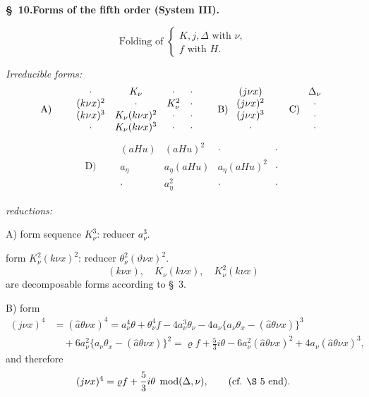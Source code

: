 \documentclass[11pt]{article}
\newcommand{\A}{\Delta}
\newcommand{\R}{\varrho}
\newcommand{\hata}{\widehat{a}}
\newcommand{\modu}[1]{\;\operatorname{mod} #1}
\providecommand{\modu}[1]{\;\operatorname{mod} #1}
\begin{document}
\begin{center}
\textbf{\S\ 10.\quad Forms of the fifth order (System III).}
\end{center}

\[
\text{Folding of }\left\{\begin{array}{l}
K,j,\A \text{ with }\nu,\\
f\text{ with }H.
\end{array}\right.
\]

\noindent\emph{Irreducible forms:}
\[
\begin{array}{c@{\qquad}c@{\qquad}c@{\qquad}c}
\text{A)} & \begin{array}{cccc}
\cdot&K_\nu&\cdot&\cdot\\
(k\nu x)^2&\cdot&K_\nu^2&\cdot\\
(k\nu x)^3&K_\nu(k\nu x)^2&\cdot&\cdot\\
\cdot&K_\nu(k\nu x)^3&\cdot&\cdot
\end{array}
&
\text{B)}\ \begin{array}{c}(j\nu x)\\(j\nu x)^2\\(j\nu x)^3\\ \cdot\end{array}
&
\text{C)}\ \begin{array}{c}\A_\nu\\\cdot\\\cdot\\\cdot\end{array}
\end{array}
\]
\[
\text{D)}\qquad
\begin{array}{cccc}
(aHu)&(aHu)^2&\cdot&\cdot\\
a_\eta&a_\eta(aHu)&a_\eta(aHu)^2&\cdot\\
\cdot&a_\eta^2&\cdot&\cdot
\end{array}
\]

\noindent\emph{reductions:}

\noindent A) form sequence $K_\nu^3$: reducer $a_\nu^3$.

form $K_\nu^2(k\nu x)^2$: reducer $\theta_\nu^2(\vartheta\nu x)^2$.
\[
(k\nu x),\quad K_\nu(k\nu x),\quad K_\nu^2(k\nu x)
\]
are decomposable forms according to \S\ 3.

\noindent B) form
\[
\begin{aligned}
(j\nu x)^4&=(\hata\theta\nu x)^4
=a_\nu^4\theta+\theta_\nu^4 f-4a_\nu^3\theta_\nu
-4a_\nu\{a_\nu\theta_x-(\hata\theta\nu x)\}^3\\
&\quad+6a_\nu^2\{a_\nu\theta_x-(\hata\theta\nu x)\}^2
=\R f+\frac53 i\theta-6a_\nu^2(\hata\theta\nu x)^2
+4a_\nu(\hata\theta\nu x)^3,
\end{aligned}
\]
and therefore
\[
(j\nu x)^4=\R f+\frac53 i\theta\modu{(\A,\nu)},\qquad (\text{cf. \S\ 5 end}).
\]
\end{document}
